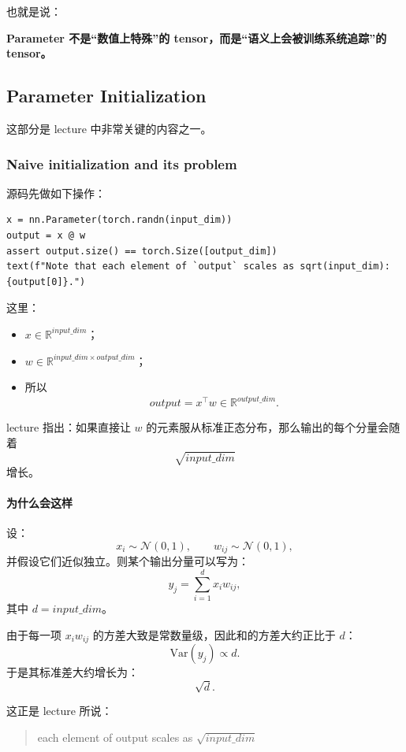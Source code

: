 \documentclass[a4paper,UTF8]{article}
\numberwithin{equation}{section}
\begin{document}
也就是说：
\begin{center}
\textbf{Parameter 不是“数值上特殊”的 tensor，而是“语义上会被训练系统追踪”的 tensor。}
\end{center}

\subsection{Parameter Initialization}

这部分是 lecture 中非常关键的内容之一。

\subsubsection{Naive initialization and its problem}

源码先做如下操作：
\begin{verbatim}
x = nn.Parameter(torch.randn(input_dim))
output = x @ w
assert output.size() == torch.Size([output_dim])
text(f"Note that each element of `output` scales as sqrt(input_dim): {output[0]}.")
\end{verbatim}

这里：
\begin{itemize}
    \item \(x \in \mathbb{R}^{input\_dim}\)；
    \item \(w \in \mathbb{R}^{input\_dim \times output\_dim}\)；
    \item 所以
    \[
    output = x^\top w \in \mathbb{R}^{output\_dim}.
    \]
\end{itemize}

lecture 指出：如果直接让 \(w\) 的元素服从标准正态分布，那么输出的每个分量会随着
\[
\sqrt{input\_dim}
\]
增长。

\paragraph{为什么会这样}
设：
\[
x_i \sim \mathcal{N}(0,1),\qquad w_{ij} \sim \mathcal{N}(0,1),
\]
并假设它们近似独立。则某个输出分量可以写为：
\[
y_j = \sum_{i=1}^{d} x_i w_{ij},
\]
其中 \(d = input\_dim\)。

由于每一项 \(x_i w_{ij}\) 的方差大致是常数量级，因此和的方差大约正比于 \(d\)：
\[
\mathrm{Var}(y_j) \propto d.
\]
于是其标准差大约增长为：
\[
\sqrt{d}.
\]

这正是 lecture 所说：
\begin{quote}
each element of output scales as \(\sqrt{input\_dim}\)
\end{quote}
\end{document}
